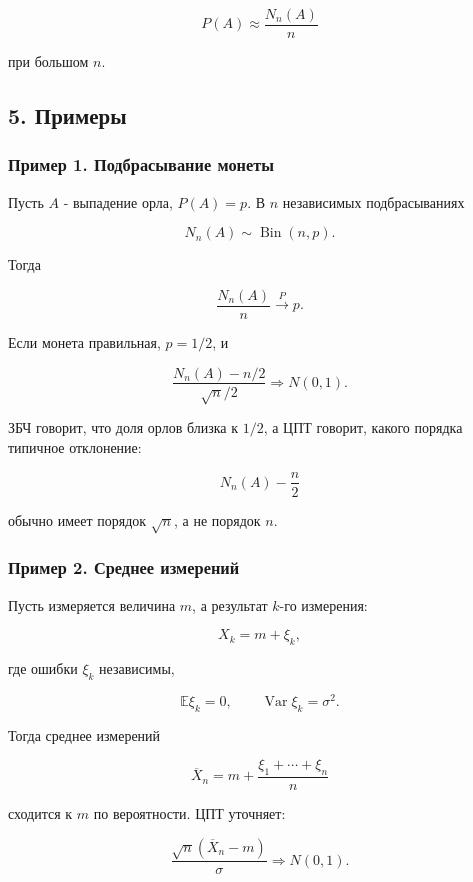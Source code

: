\documentclass[
  11pt,
  a4paper,
]{article}
\begin{document}
\[
P(A)\approx \frac{N_n(A)}{n}
\]

при большом \(n\).

\subsection{5. Примеры}\label{ux43fux440ux438ux43cux435ux440ux44b}

\subsubsection{Пример 1. Подбрасывание
монеты}\label{ux43fux440ux438ux43cux435ux440-1.-ux43fux43eux434ux431ux440ux430ux441ux44bux432ux430ux43dux438ux435-ux43cux43eux43dux435ux442ux44b}

Пусть \(A\) - выпадение орла, \(P(A)=p\). В \(n\) независимых
подбрасываниях

\[
N_n(A)\sim\operatorname{Bin}(n,p).
\]

Тогда

\[
\frac{N_n(A)}{n}\xrightarrow{P}p.
\]

Если монета правильная, \(p=1/2\), и

\[
\frac{N_n(A)-n/2}{\sqrt{n}/2}
\Rightarrow
N(0,1).
\]

ЗБЧ говорит, что доля орлов близка к \(1/2\), а ЦПТ говорит, какого
порядка типичное отклонение:

\[
N_n(A)-\frac n2
\]

обычно имеет порядок \(\sqrt n\), а не порядок \(n\).

\subsubsection{Пример 2. Среднее
измерений}\label{ux43fux440ux438ux43cux435ux440-2.-ux441ux440ux435ux434ux43dux435ux435-ux438ux437ux43cux435ux440ux435ux43dux438ux439}

Пусть измеряется величина \(m\), а результат \(k\)-го измерения:

\[
X_k=m+\xi_k,
\]

где ошибки \(\xi_k\) независимы,

\[
\mathbb E\xi_k=0,
\qquad
\operatorname{Var}\xi_k=\sigma^2.
\]

Тогда среднее измерений

\[
\overline X_n=m+\frac{\xi_1+\cdots+\xi_n}{n}
\]

сходится к \(m\) по вероятности. ЦПТ уточняет:

\[
\frac{\sqrt n(\overline X_n-m)}{\sigma}
\Rightarrow
N(0,1).
\]
\end{document}
